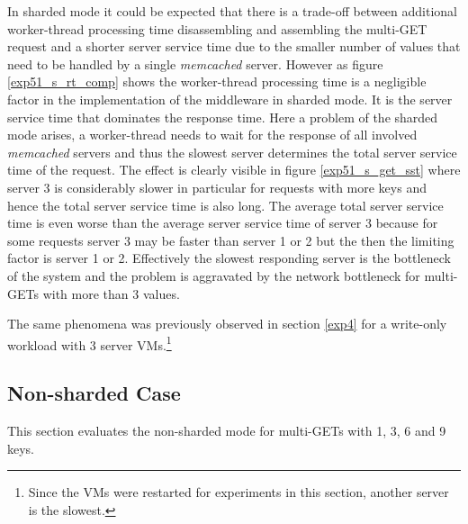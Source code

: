 \documentclass[report.tex]{subfiles}
\begin{document}
In sharded mode it could be expected that there is a trade-off between additional worker-thread processing time disassembling and assembling the multi-GET request and a shorter server service time due to the smaller number of values that need to be handled by a single \emph{memcached} server. However as figure \ref{exp51_s_rt_comp} shows the worker-thread processing time is a negligible factor in the implementation of the middleware in sharded mode. It is the server service time that dominates the response time. Here a problem of the sharded mode arises, a worker-thread needs to wait for the response of all involved \emph{memcached} servers and thus the slowest server determines the total server service time of the request.  The effect is clearly visible in figure \ref{exp51_s_get_sst} where server 3 is considerably slower in particular for requests with more keys and hence the total server service time is also long. The average total server service time is even worse than the average server service time of server 3 because for some requests server 3 may be faster than server 1 or 2 but the then the limiting factor is server 1 or 2. Effectively the slowest responding server is the bottleneck of the system and the problem is aggravated by the network bottleneck for multi-GETs with more than 3 values.

The same phenomena was previously observed in section \ref{exp4} for a write-only workload with 3 server VMs.\footnote{Since the VMs were restarted for experiments in this section, another server is the slowest.}


\subsection{Non-sharded Case}

This section evaluates the non-sharded mode for multi-GETs with 1, 3, 6 and 9 keys.
\end{document}
